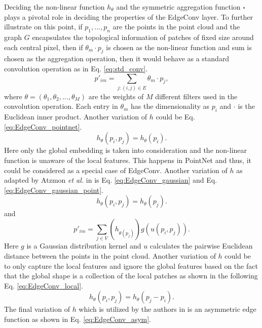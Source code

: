 Deciding the non-linear function $h_{\theta}$ and the symmetric aggregation function $\square$ plays a pivotal role in deciding the properties of the EdgeConv layer. To further illustrate on this point, if $p_1, ..., p_n$ are the points in the point cloud and the graph $G$ encapsulates the topological information of patches of fixed size around each central pixel, then if $\theta _m \cdot p_j$ is chosen as the non-linear function and sum is chosen as the aggregation operation, then it would behave as a standard convolution operation as in Eq. \ref{eq:std_conv}.
\begin{equation}
    \label{eq:std_conv}
    p'_{im} = \sum_{j:(i,j) \in E}\theta _m \cdot p_j,
\end{equation}
where $\theta = (\theta _1, \theta _2, ... , \theta _M)$ are the weights of $M$ different filters used in the convolution operation. Each entry in $\theta _m$ has the dimensionality as $p_i$ and $\cdot$ is the Euclidean inner product. Another variation of $h$ could be Eq. \ref{eq:EdgeConv_pointnet}. 
\begin{equation}
    \label{eq:EdgeConv_pointnet}
    h_{\theta}(p_i, p_j) = h_{\theta}(p_i).
\end{equation}
Here only the global embedding is taken into consideration and the non-linear function is unaware of the local features. This happens in PointNet and thus, it could be considered as a special case of EdgeConv. Another variation of $h$ as adapted by Atzmon \textit{et al.} in \cite{atzmon2018point} is Eq. \ref{eq:EdgeConv_gaussian} and Eq. \ref{eq:EdgeConv_gaussian_point}.
\begin{equation}
    \label{eq:EdgeConv_gaussian}
    h_{\theta}(p_i, p_j) = h_{\theta}(p_j).
\end{equation}
and 
\begin{equation}
    \label{eq:EdgeConv_gaussian_point}
    p'_{im} = \sum_{j \in V}(h_{\theta (p_j)})g(u(p_i,p_j)).
\end{equation}
Here $g$ is a Gaussian distribution kernel and $u$ calculates the pairwise Euclidean distance between the points in the point cloud. Another variation of $h$ could be to only capture the local features and ignore the global features based on the fact that the global shape is a collection of the local patches as shown in the following Eq. \ref{eq:EdgeConv_local}.
\begin{equation}
    \label{eq:EdgeConv_local}
    h_{\theta}(p_i, p_j) = h_{\theta}(p_j-p_i).
\end{equation}
The final variation of $h$ which is utilized by the authors in \cite{wang2019dynamic} is an asymmetric edge function as shown in Eq. \ref{eq:EdgeConv_asym}.
